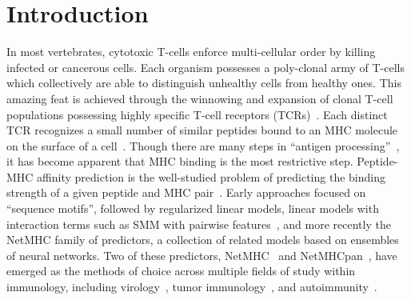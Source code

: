 \section{Introduction}

In most vertebrates, cytotoxic T-cells enforce multi-cellular order by killing infected or cancerous cells. Each organism possesses a poly-clonal army of T-cells which collectively are able to distinguish unhealthy cells from healthy ones. This amazing feat is achieved through the winnowing and expansion of clonal T-cell populations possessing highly specific T-cell receptors (TCRs)~\cite{Blackman_1990}. Each distinct TCR recognizes a small number of similar peptides bound to an MHC molecule on the surface of a cell~\cite{Huseby_2005}. Though there are many steps in ``antigen processing''~\cite{Cresswell_2005}, it has become apparent that MHC binding is the most restrictive step. Peptide-MHC affinity prediction is the well-studied problem of predicting the binding strength of a given peptide and MHC pair~\cite{Lundegaard_2007}. Early approaches focused on ``sequence motifs''\cite{Sette_1989}, followed by regularized linear models, linear models with interaction terms such as SMM with pairwise features~\cite{Peters_2003}, and more recently the NetMHC family of predictors, a collection of related models based on ensembles of neural networks. Two of these predictors, NetMHC~\cite{Lundegaard_2008} and NetMHCpan~\cite{Nielsen_2007}, have emerged as the methods of choice across multiple fields of study within immunology, including virology~\cite{Lund_2011}, tumor immunology~\cite{Gubin_2015}, and autoimmunity~\cite{Abreu_2012}. 


